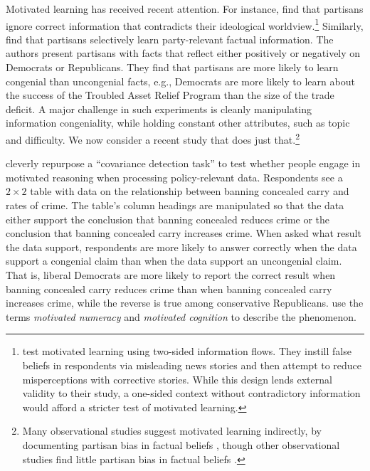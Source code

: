 \documentclass[12pt, letterpaper]{article}
\begin{document}
Motivated learning has received recent attention. For instance, \citet{nyhanreifler2010} find that partisans ignore correct information that contradicts their ideological worldview.\footnote{\citeauthor{nyhanreifler2010} test motivated learning using two-sided information flows. They instill false beliefs in respondents via misleading news stories and then attempt to reduce misperceptions with corrective stories. While this design lends external validity to their study, a one-sided context without contradictory information would afford a stricter test of motivated learning.} Similarly, \citet{jerit2012} find that partisans selectively learn party-relevant factual information. The authors present partisans with facts that reflect either positively or negatively on Democrats or Republicans. They find that partisans are more likely to learn congenial than uncongenial facts, e.g., Democrats are more likely to learn about the success of the Troubled Asset Relief Program than the size of the trade deficit. A major challenge in such experiments is cleanly manipulating information congeniality, while holding constant other attributes, such as topic and difficulty. We now consider a recent study that does just that.\footnote{
Many observational studies suggest motivated learning indirectly, by documenting partisan bias in factual beliefs \citep{bartels2002, shani2006, jerit2012}, though other observational studies find little partisan bias in factual beliefs \citep[e.g.,][]{gaines2007, blais2010}.}

\citet{kahan2017} cleverly repurpose a ``covariance detection task'' \citep[see][]{gilovich1991} to test whether people engage in motivated reasoning when processing policy-relevant data. Respondents see a $2 \times 2$ table with data on the relationship between banning concealed carry and rates of crime. The table's column headings are manipulated so that the data either support the conclusion that banning concealed reduces crime or the conclusion that banning concealed carry increases crime. When asked what result the data support, respondents are more likely to answer correctly when the data support a congenial claim than when the data support an uncongenial claim. That is, liberal Democrats are more likely to report the correct result when banning concealed carry reduces crime than when banning concealed carry increases crime, while the reverse is true among conservative Republicans. \citeauthor{kahan2017} use the terms {\it motivated numeracy} and {\it motivated cognition} to describe the phenomenon.
\end{document}
